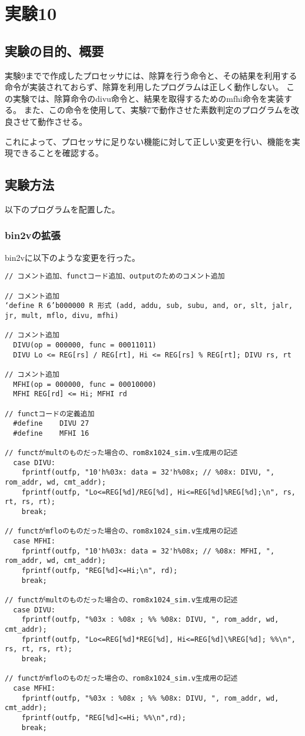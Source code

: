 \section{実験10}
\subsection{実験の目的、概要}
実験9までで作成したプロセッサには、除算を行う命令と、その結果を利用する命令が実装されておらず、除算を利用したプログラムは正しく動作しない。
この実験では、除算命令のdivu命令と、結果を取得するためのmfhi命令を実装する。
また、この命令を使用して、実験7で動作させた素数判定のプログラムを改良させて動作させる。

これによって、プロセッサに足りない機能に対して正しい変更を行い、機能を実現できることを確認する。

\subsection{実験方法}
以下のプログラムを配置した。


\subsubsection{bin2vの拡張}
bin2vに以下のような変更を行った。
\begin{lstlisting}[caption={bin2vの拡張},label={bin2vの拡張}]
// コメント追加、functコード追加、outputのためのコメント追加

// コメント追加
‘define R 6’b000000 R 形式 (add, addu, sub, subu, and, or, slt, jalr, jr, mult, mflo, divu, mfhi)

// コメント追加
  DIVU(op = 000000, func = 00011011)
  DIVU Lo <= REG[rs] / REG[rt], Hi <= REG[rs] % REG[rt]; DIVU rs, rt

// コメント追加
  MFHI(op = 000000, func = 00010000)
  MFHI REG[rd] <= Hi; MFHI rd

// functコードの定義追加
  #define    DIVU 27
  #define    MFHI 16

// functがmultのものだった場合の、rom8x1024_sim.v生成用の記述
  case DIVU:
    fprintf(outfp, "10'h%03x: data = 32'h%08x; // %08x: DIVU, ", rom_addr, wd, cmt_addr);
    fprintf(outfp, "Lo<=REG[%d]/REG[%d], Hi<=REG[%d]%REG[%d];\n", rs, rt, rs, rt);
    break;

// functがmfloのものだった場合の、rom8x1024_sim.v生成用の記述
  case MFHI:
    fprintf(outfp, "10'h%03x: data = 32'h%08x; // %08x: MFHI, ", rom_addr, wd, cmt_addr);
    fprintf(outfp, "REG[%d]<=Hi;\n", rd);
    break;

// functがmultのものだった場合の、rom8x1024_sim.v生成用の記述
  case DIVU:
    fprintf(outfp, "%03x : %08x ; %% %08x: DIVU, ", rom_addr, wd, cmt_addr);
    fprintf(outfp, "Lo<=REG[%d]*REG[%d], Hi<=REG[%d]\%REG[%d]; %%\n", rs, rt, rs, rt);
    break;

// functがmfloのものだった場合の、rom8x1024_sim.v生成用の記述 
  case MFHI:
    fprintf(outfp, "%03x : %08x ; %% %08x: DIVU, ", rom_addr, wd, cmt_addr);
    fprintf(outfp, "REG[%d]<=Hi; %%\n",rd);
    break;
\end{lstlisting}

